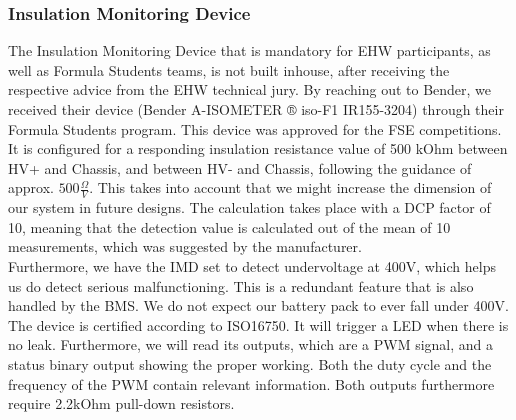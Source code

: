 \subsubsection{Insulation Monitoring Device}
The Insulation Monitoring Device that is mandatory for EHW participants, as well as Formula Students teams, is not built inhouse, after receiving the respective advice from the EHW technical jury. By reaching out to Bender, we received their device (Bender A-ISOMETER ® iso-F1 IR155-3204) through their Formula Students program. This device was approved for the FSE competitions. It is configured for a responding insulation resistance value of 500 kOhm between HV+ and Chassis, and between HV- and Chassis, following the guidance of approx. \(500 \frac{\Omega}{V}\). This takes into account that we might increase the dimension of our system in future designs. The calculation takes place with a DCP factor of 10, meaning that the detection value is calculated out of the mean of 10 measurements, which was suggested by the manufacturer.\\
Furthermore, we have the IMD set to detect undervoltage at 400V, which helps us do detect serious malfunctioning. This is a redundant feature that is also handled by the BMS. We do not expect our battery pack to ever fall under 400V. \\
The device is certified according to ISO16750. It will trigger a LED when there is no leak. Furthermore, we will read its outputs, which are a PWM signal, and a status binary output showing the proper working. Both the duty cycle and the frequency of the PWM contain relevant information. Both outputs furthermore require 2.2kOhm pull-down resistors. \\
